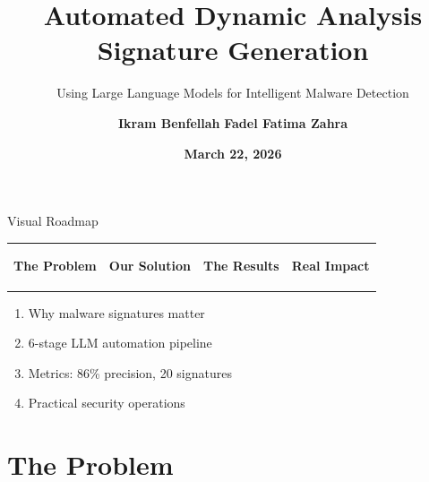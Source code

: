 \documentclass[11pt,aspectratio=16:9]{beamer}
\title{\textbf{Automated Dynamic Analysis \\ Signature Generation}}
\subtitle{Using Large Language Models for Intelligent Malware Detection}
\author{\textbf{Ikram Benfellah} \quad \textbf{Fadel Fatima Zahra}}
\institute{{\small S7 Capstone Project - Cybersecurity Engineering}}
\date{\textbf{March 22, 2026}}
\begin{document}

\begin{frame}[plain]
  \titlepage
\end{frame}

\begin{frame}{Visual Roadmap}
  \centering
  \large
  \vspace{1cm}
  \begin{tabular}{cccc}
    \colorbox{accent1!30}{\parbox{2cm}{\centering \textbf{The Problem}}} &
    \colorbox{accent2!30}{\parbox{2cm}{\centering \textbf{Our Solution}}} &
    \colorbox{accent3!30}{\parbox{2cm}{\centering \textbf{The Results}}} &
    \colorbox{accent1!30}{\parbox{2cm}{\centering \textbf{Real Impact}}}
  \end{tabular}
  
  \vspace{2cm}
  \begin{enumerate}
    \item[\textcolor{accent1}{\large ▸}] Why malware signatures matter
    \item[\textcolor{accent2}{\large ▸}] 6-stage LLM automation pipeline
    \item[\textcolor{accent3}{\large ▸}] Metrics: 86\% precision, 20 signatures
    \item[\textcolor{accent1}{\large ▸}] Practical security operations
  \end{enumerate}
\end{frame}

\section{The Problem}
\end{document}
